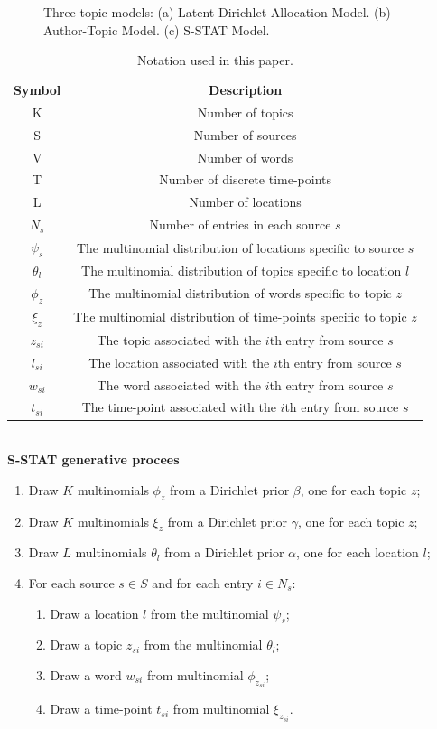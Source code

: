 \documentclass{sig-alternate}
\newcommand{\model}{{S-STAT}\xspace} %
\begin{document}
\begin{figure}[ht]
\begin{center}
\end{center}
\caption{Three topic models: (a) Latent Dirichlet Allocation Model. (b) Author-Topic Model. (c) S-STAT Model.}
\label{fig:models}
\end{figure}


\begin{table}
\small \centering
\caption{Notation used in this paper.}
\begin{tabular}{c c}
\hline
{\bf Symbol} & {\bf Description}  \\
K & Number of topics  \\
S & Number of sources \\
V & Number of words \\
T & Number of discrete time-points \\
L & Number of locations \\
$N_s$ & Number of entries in each source $s$\\
$\psi_s$ & The multinomial distribution of locations specific to source $s$\\
$\theta_l$ & The multinomial distribution of topics specific to location $l$\\
$\phi_z$ & The multinomial distribution of words specific to topic $z$\\
$\xi_z$ & The multinomial distribution of time-points specific to topic $z$\\
$z_{si}$ & The topic associated with the $i$th entry from source $s$ \\
$l_{si}$ & The location associated with the $i$th entry from source $s$ \\
$w_{si}$ & The word associated with the $i$th entry from source $s$ \\
$t_{si}$ & The time-point associated with the $i$th entry from source $s$ \\
\hline
\end{tabular}
\label{tab:notation}
\end{table}

\ \\{\bf \model generative procees}
\begin{enumerate}
\item Draw $K$ multinomials $\phi_z$ from a Dirichlet prior $\beta$, one for each topic $z$;
\item Draw $K$ multinomials $\xi_z$ from a Dirichlet prior $\gamma$, one for each topic $z$;
\item Draw $L$ multinomials $\theta_l$ from a Dirichlet prior $\alpha$, one for each location $l$;
\item For each source  $s \in S$ and for each entry $i \in N_s$:
\begin{enumerate}
\item Draw a location $l$ from the multinomial $\psi_s$;
\item Draw a topic $z_{si}$ from the multinomial $\theta_l$;
\item Draw a word $w_{si}$ from multinomial $\phi_{z_{si}}$;
\item Draw a time-point $t_{si}$ from multinomial $\xi_{z_{si}}$.
\end{enumerate}
\end{enumerate}
\end{document}
